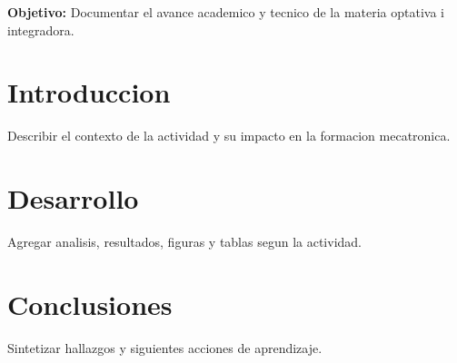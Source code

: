 \documentclass[spanish,letterpaper,oneside]{article}
\begin{document}
\templatePortrait
\templatePagecfg
\onehalfspacing

\begin{abstractd}
\textbf{Objetivo:} Documentar el avance academico y tecnico de la materia optativa i integradora.
\end{abstractd}

\templateIndex
\templateFinalcfg

\section{Introduccion}
Describir el contexto de la actividad y su impacto en la formacion mecatronica.

\section{Desarrollo}
Agregar analisis, resultados, figuras y tablas segun la actividad.

\section{Conclusiones}
Sintetizar hallazgos y siguientes acciones de aprendizaje.



\end{document}
